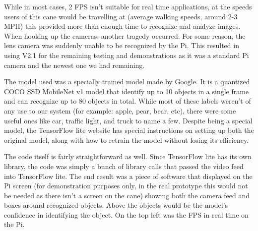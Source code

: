 \documentclass[letterpaper,12pt]{article}
\begin{document}
\medskip
{}\par
While in most cases, 2 FPS isn't suitable for real time applications, at the speeds users of this cane would be travelling at (average walking speeds, around 2-3 MPH) this provided more than enough time to recognize and analyze images. When hooking up the cameras, another tragedy occurred. For some reason, the lens camera was suddenly unable to be recognized by the Pi. This resulted in using V2.1 for the remaining testing and demonstrations as it was a standard Pi camera and the newest one we had remaining.\par
The model used was a specially trained model made by Google. It is a quantized COCO SSD MobileNet v1 model that identify up to 10 objects in a single frame and can recognize up to 80 objects in total. While most of these labels weren't of any use to our system (for example: apple, pear, bear, etc), there were some useful ones like car, traffic light, and truck to name a few. Despite being a special model, the TensorFlow lite website has special instructions on setting up both the original model, along with how to retrain the model without losing its efficiency. \par
The code itself is fairly straightforward as well. Since TensorFlow lite has its own library, the code was simply a bunch of library calls that passed the video feed into TensorFlow lite. The end result was a piece of software that displayed on the Pi screen (for demonstration purposes only, in the real prototype this would not be needed as there isn't a screen on the cane) showing both the camera feed and boxes around recognized objects. Above the objects would be the model's confidence in identifying the object. On the top left was the FPS in real time on the Pi. \par
\medskip
{}\par
\end{document}
